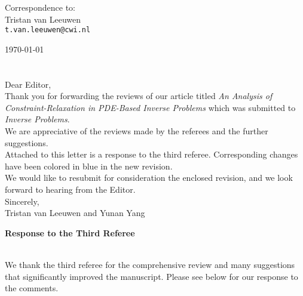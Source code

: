\documentclass[11pt]{article}
\begin{document}
\addtocounter{page}{-1}
\thispagestyle{empty}

\hfill
\begin{flushright}
Correspondence to: \\
Tristan van Leeuwen\\
\texttt{t.van.leeuwen@cwi.nl}\\
\end{flushright}

\vspace{1em}
\hfill\today
\ \\
\ \\
\ \\
\noindent Dear Editor,\ \\

\noindent  Thank you for forwarding the reviews of our article
titled \emph{An Analysis of Constraint-Relaxation in PDE-Based Inverse Problems} which was submitted to \textit{Inverse Problems}. \ \\

\noindent  We are appreciative of the reviews made by the referees and  the further suggestions.\ \\

\noindent Attached to this letter is a response to the third referee. Corresponding changes have been colored in blue in the new revision. \ \\

\noindent We would like to resubmit for consideration the enclosed revision, and we look forward to hearing from the Editor. \ \\

\noindent  Sincerely, \ \\

\noindent  Tristan van Leeuwen and Yunan Yang



\clearpage


\centerline{\textbf{{\large Response to the Third Referee}}}
\ \\
We thank the third referee for the comprehensive review and many suggestions that significantly improved the manuscript. Please see below for our response to the comments. 
\end{document}
